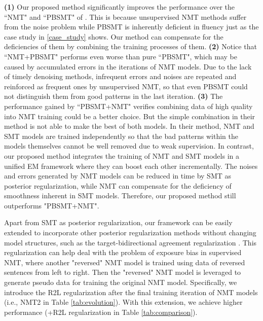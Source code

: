 \documentclass[letterpaper]{article} \usepackage{aaai19}  \usepackage{times}  \usepackage{helvet}  \usepackage{courier}  \usepackage{url}  \usepackage{graphicx}  \usepackage{amsmath}
\begin{document}
\textbf{(1)} Our proposed method significantly improves the performance over the ``NMT" and ``PBSMT" of \cite{lample2018phrase}. This is because unsupervised NMT methods suffer from the noise problem while PBSMT is inherently deficient in fluency just as the case study in \ref{case_study} shows. Our method can compensate for the deficiencies of them by combining the training processes of them. 
\textbf{(2)} Notice that ``NMT+PBSMT" performs even worse than pure ``PBSMT", which may be caused by accumulated errors in the iterations of NMT models. Due to the lack of timely denoising methods, infrequent errors and noises are repeated and reinforced as frequent ones by unsupervised NMT, so that even PBSMT could not distinguish them from good patterns in the last iteration. \textbf{(3)} The performance gained by ``PBSMT+NMT" verifies combining data of high quality into NMT training could be a better choice. But the simple combination in their method is not able to make the best of both models. In their method, NMT and SMT models are trained independently so that the bad patterns within the models themselves cannot be well removed due to weak supervision. In contrast, our proposed method integrates the training of NMT and SMT models in a unified EM framework where they can boost each other incrementally. The noises and errors generated by NMT models can be reduced in time by SMT as posterior regularization, while NMT can compensate for the deficiency of smoothness inherent in SMT models. Therefore, our proposed method still outperforms "PBSMT+NMT".

Apart from SMT as posterior regularization, our framework can be easily extended to incorporate other posterior regularization methods without changing model structures, such as the target-bidirectional agreement regularization \cite{Zhang2018RegularizingNM}. This regularization can help deal with the problem of exposure bias in supervised NMT, where another "reversed" NMT model is trained using data of reversed sentences from left to right. Then the "reversed" NMT model is leveraged to generate pseudo data for training the original NMT model. Specifically, we introduce the R2L regularization after the final training iteration of NMT models (i.e., NMT2 in Table \ref{tab:evolution}). With this extension, we achieve higher performance (+R2L regularization in Table \ref{tab:comparison}). 
\end{document}
